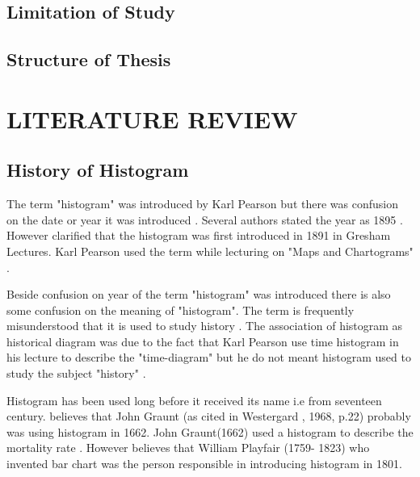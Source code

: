 \section{Limitation of Study}

\section{Structure of Thesis}


\addblankpage %

\chapter{\textbf{LITERATURE REVIEW}}\label{Introchap} 

\section{History of Histogram}

The term "histogram" was introduced by Karl Pearson \cite[]{ross2010introductory, rufilanchas2017origin} but there was confusion on the date or year it was introduced \cite[]{rufilanchas2017origin,ioannidis2003history}. Several authors stated the year as 1895 \cite[]{beniger1976history, dodge2008concise,ross2010introductory,li2016essential}. However \cite[]{magnello2014introducing, rufilanchas2017origin} clarified that the histogram was first introduced in 1891 in Gresham Lectures. Karl Pearson used the term while lecturing on "Maps and Chartograms" \cite[]{rufilanchas2017origin}.

Beside confusion on year of the term "histogram" was introduced there is also some confusion on the meaning of "histogram". The term is frequently misunderstood that it is used to study history \cite[]{rufilanchas2017origin}.  The association of histogram as historical diagram was due to the fact that Karl Pearson use time histogram in his lecture to describe the "time-diagram" but he do not meant histogram used to study the subject "history" \cite[]{rufilanchas2017origin}.

Histogram has been used long before it received its name i.e from seventeen century. \cite[]{scott1979optimal,loquin2008histogram} believes that John Graunt (as cited in Westergard , 1968, p.22) probably was using histogram in 1662. John Graunt(1662) used a histogram to describe the mortality rate \cite[]{copas1983non,scott2005multidimensional}.  However \cite[]{chen2007handbook,ross2010introductory,rufilanchas2017origin} believes that William Playfair (1759- 1823) who invented bar chart was the person responsible in introducing histogram in 1801.  

